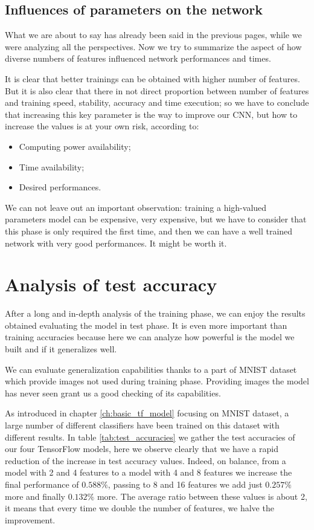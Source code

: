 \subsection{Influences of parameters on the network}

What we are about to say has already been said in the previous pages, while we were analyzing all the perspectives. Now we try to summarize the aspect of how diverse numbers of features influenced network performances and times.

It is clear that better trainings can be obtained with higher number of features. But it is also clear that there in not direct proportion between number of features and training speed, stability, accuracy and time execution; so we have to conclude that increasing this key parameter is the way to improve our \acs{CNN}, but how to increase the values is at your own risk, according to:
\begin{itemize}
	\item Computing power availability;
	\item Time availability;
	\item Desired performances.
\end{itemize}

We can not leave out an important observation: training a high-valued parameters model can be expensive, very expensive, but we have to consider that this phase is only required the first time, and then we can have a well trained network with very good performances. It might be worth it.

\section{Analysis of test accuracy}

After a long and in-depth analysis of the training phase, we can enjoy the results obtained evaluating the model in test phase. It is even more important than training accuracies because here we can analyze how powerful is the model we built and if it generalizes well.

We can evaluate generalization capabilities thanks to a part of \acs{MNIST} dataset which provide images not used during training phase. Providing images the model has never seen grant us a good checking of its capabilities.

As introduced in chapter \ref{ch:basic_tf_model} focusing on \acs{MNIST} dataset, a large number of different classifiers have been trained on this dataset with different results. In table \ref{tab:test_accuracies} we gather the test accuracies of our four TensorFlow models, here we observe clearly that we have a rapid reduction of the increase in test accuracy values. Indeed, on balance, from a model with 2 and 4 features to a model with 4 and 8 features we increase the final performance of $0.588 \%$, passing to 8 and 16 features we add just $0.257 \%$ more and finally $0.132 \%$ more. The average ratio between these values is about 2, it means that every time we double the number of features, we halve the improvement.

